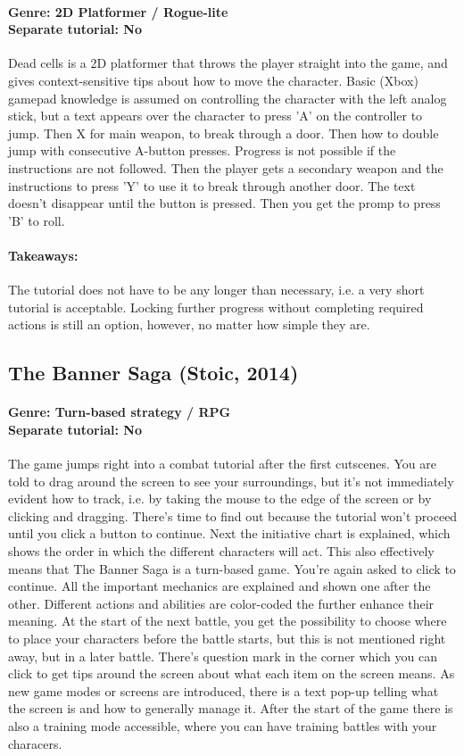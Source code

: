 \paragraph{Genre: 2D Platformer / Rogue-lite \\ Separate tutorial: No \\}
Dead cells is a 2D platformer that throws the player straight into the game, and gives context-sensitive tips about how to move the character. Basic (Xbox) gamepad knowledge is assumed on controlling the character with the left analog stick, but a text appears over the character to press 'A' on the controller to jump. Then X for main weapon, to break through a door. Then how to double jump with consecutive A-button presses. Progress is not possible if the instructions are not followed. Then the player gets a secondary weapon and the instructions to press 'Y' to use it to break through another door. The text doesn't disappear until the button is pressed. Then you get the promp to press 'B' to roll.
\paragraph{Takeaways:}
The tutorial does not have to be any longer than necessary, i.e. a very short tutorial is acceptable. Locking further progress without completing required actions is still an option, however, no matter how simple they are.

\subsection{The Banner Saga (Stoic, 2014)}
\paragraph{Genre: Turn-based strategy / RPG \\ Separate tutorial: No \\}
The game jumps right into a combat tutorial after the first cutscenes. You are told to drag around the screen to see your surroundings, but it's not immediately evident how to track, i.e. by taking the mouse to the edge of the screen or by clicking and dragging. There's time to find out because the tutorial won't proceed until you click a button to continue. Next the initiative chart is explained, which shows the order in which the different characters will act. This also effectively means that The Banner Saga is a turn-based game. You're again asked to click to continue. All the important mechanics are explained and shown one after the other. Different actions and abilities are color-coded the further enhance their meaning. At the start of the next battle, you get the possibility to choose where to place your characters before the battle starts, but this is not mentioned right away, but in a later battle. There's question mark in the corner which you can click to get tips around the screen about what each item on the screen means. As new game modes or screens are introduced, there is a text pop-up telling what the screen is and how to generally manage it. After the start of the game there is also a training mode accessible, where you can have training battles with your characers.
